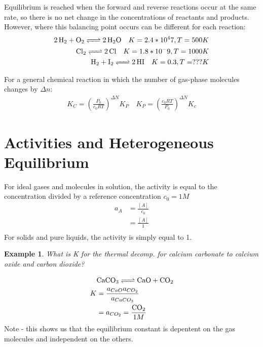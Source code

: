 \documentclass{article}  %
\newtheorem{exmp}{Example}
\begin{document}
Equilibrium is reached when the forward and reverse reactions occur at the same rate, so there is no net change in the concentrations of reactants and products. However, where this balancing point occurs can be different for each reaction:
\begin{equation*}
    \begin{aligned}
        \ce{2H2 + O2 <=> 2H2O} \quad K = 2.4 * 10^47, T = 500 K \\
        \ce{Cl2 <=> 2Cl} \quad K = 1.8 * 10 ^-9, T = 1000 K \\
        \ce{H2 + I2 <=> 2HI} \quad K = 0.3, T = ??? K
    \end{aligned}
\end{equation*}

For a general chemical reaction in which the number of gas-phase molecules changes by $\Delta n$: 
\begin{equation*}
    \begin{aligned}
        K_C = (\frac{P_0}{c_0RT})^{\Delta N} K_P \quad K_P = (\frac{c_0RT}{P_0})^{\Delta N} K_c
    \end{aligned}
\end{equation*}

\section*{Activities and Heterogeneous Equilibrium}
For ideal gases and molecules in solution, the activity is equal to the concentration divided by a reference concentration $c_0 = 1M$
\begin{equation*}
    \begin{aligned}
        a_A &= \frac{[A]}{c_0} \\
            &=\frac{[A]}{1} \\
    \end{aligned}
\end{equation*}
For solids and pure liquids, the activity is simply equal to 1.
\begin{exmp}
    What is K for the thermal decomp. for calcium carbonate to calcium oxide and carbon dioxide?
\end{exmp}
\begin{equation*}
    \begin{aligned}
        &\ce{CaCO3 <=> CaO + CO2} \\
        K &= \frac{a_{CaO}a_{CO_2}}{a_{CaCO_3}} \\
          &= a_{CO_2} = \frac{\ce{CO2}}{1M}
    \end{aligned}
\end{equation*}
Note - this shows us that the equilibrium constant is depentent on the gas molecules and independent on the others.
\end{document}
